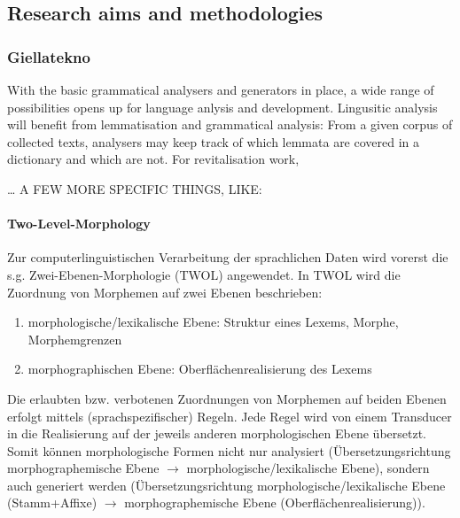 \documentclass[a4paper,12pt]{article}
\begin{document}
\subsection{Research aims and methodologies}

\subsubsection{Giellatekno} 


With the basic grammatical analysers and generators in place, a wide range of possibilities opens up for language anlysis and development. Lingusitic analysis will benefit from lemmatisation and grammatical analysis: From a given corpus of collected texts, analysers may keep track of which lemmata are covered in a dictionary and which are not. For revitalisation work, 

… A FEW MORE SPECIFIC THINGS, LIKE:

\paragraph{Two-Level-Morphology}
Zur computerlinguistischen Verarbeitung der sprachlichen Daten wird vorerst die s.g. Zwei-Ebenen-Morphologie (TWOL) angewendet. In TWOL wird die Zuordnung von Morphemen auf zwei Ebenen beschrieben:
\begin{enumerate}
\item morphologische/lexikalische Ebene: Struktur eines Lexems, Morphe, Morphemgrenzen
\item morphographischen Ebene: Oberflächenrealisierung des Lexems
\end{enumerate}
Die erlaubten bzw. verbotenen Zuordnungen von Morphemen auf beiden Ebenen erfolgt mittels (sprachspezifischer) Regeln. Jede Regel wird von einem Transducer in die Realisierung auf der jeweils anderen morphologischen Ebene übersetzt. Somit können morphologische Formen nicht nur analysiert (Übersetzungsrichtung morphographemische Ebene $\rightarrow$ morphologische/lexikalische Ebene), sondern auch generiert werden (Übersetzungsrichtung morphologische/lexikalische Ebene (Stamm+Affixe) $\rightarrow$ morphographemische Ebene (Oberflächenrealisierung)).
\end{document}
